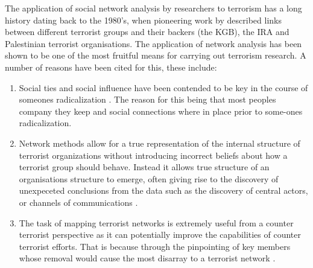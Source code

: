 The application of social network analysis by researchers to terrorism has a long history dating back to the 1980's, when pioneering work by \citep{sterling1981terror} described links between different terrorist groups and their backers (the KGB), the IRA and Palestinian terrorist organisations. The application of network analysis has been shown to be one of the most fruitful means for carrying out terrorism research. A number of reasons have been cited for this, these include:
\begin{enumerate}
\item Social ties and social influence have been contended to be key in the course of someones radicalization \citep{hegghammer2006terrorist}. The reason for this being that most peoples company they keep and social connections where in place prior to some-ones radicalization.
\item Network methods allow for a true representation of the internal structure of terrorist organizations without introducing incorrect beliefs about how a terrorist group should behave. Instead it allows true structure of an organisations structure to emerge, often giving rise to the discovery of unexpeceted conclusions from the data such as the discovery of central actors, or channels of communications \citep{morselli2009inside}.
\item  The task of mapping terrorist networks is extremely useful from a counter terrorist perspective as it can potentially improve the capabilities of counter terrorist efforts. That is because through the pinpointing of key members whose removal would cause the most disarray to a terrorist network \citep{joffres2011strategies}. 
\end{enumerate}
